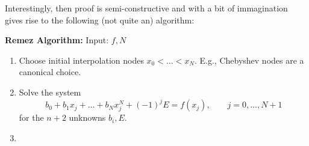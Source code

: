Interestingly, then proof is semi-constructive and with a bit of immagination 
gives rise to the following (not quite an) algorithm:

{\bf Remez Algorithm:} Input: $f, N$
\begin{enumerate}
\item Choose initial interpolation nodes $x_0 < \dots < x_N$. E.g., Chebyshev 
nodes are a canonical choice. 
\item Solve the system 
\[
      b_0 + b_1 x_j + \dots + b_{N} x_{j}^{N} + (-1)^j E = f(x_j), 
      \qquad j = 0, \dots, N+1
\]
for the $n+2$ unknowns $b_i, E$.
\item 
\end{enumerate}

